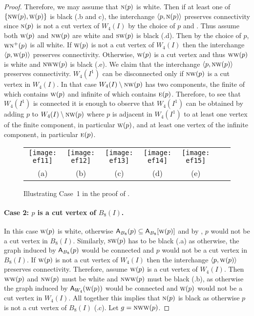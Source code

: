 \documentclass[lotsofwhite,charterfonts]{patmorin}
\newcommand{\N}{\textsc{n}}
\newcommand{\E}{\textsc{e}}
\newcommand{\SW}{\textsc{sw}}
\newcommand{\W}{\textsc{w}}
\newcommand{\NW}{\textsc{nw}}
\newcommand{\ic}[2]{\langle #1,#2 \rangle}
\newcommand{\A}[2]{\ensuremath{\protect\textup{\textsf{A}}_{#2}(#1)}}
\newcommand{\AC}[2]{\ensuremath{\protect\textup{\textsf{A}}_{#2}[#1]}}
\newcommand{\sm}{\ensuremath{\setminus}}
\newcommand{\se}{\ensuremath{\subseteq}}
\begin{document}
\begin{proof}
Therefore, we may assume that $\N(p)$ is white. Then if at least one of $\{\NW(p), \W(p)\}$ is black (.b and c), the interchange $\ic{p}{\N(p)}$ preserves connectivity since $\N(p)$ is not a cut vertex of $W_4(I)$ by the choice of $p$ and . Thus assume both $\W(p)$ and $\NW(p)$ are white and $\SW(p)$ is black (.d). Then by the choice of $p$, $\W\N^+(p)$ is all white. If $\W(p)$ is not a cut vertex of $W_4(I)$ then  the interchange $\ic{p}{\W(p)}$ preserves connectivity. Otherwise,  $\W(p)$ is a cut vertex and thus $\W\W(p)$ is white and $\NW\W(p)$ is black (.e). We claim that the interchange $\ic{p}{\NW(p)}$ preserves connectivity.  $W_4(I^1)$ can be disconnected only if $\NW(p)$ is a cut vertex in $W_4(I)$.
 In that case  $W_4(I)\sm \NW(p)$ has two components, the finite of which contains $\W(p)$ and infinite of which contains $\E(p)$. Therefore, to see that $W_4(I^1)$ is connected it is enough to observe that $W_4(I^1)$ can be obtained by adding $p$ to $W_4(I)\sm \NW(p)$ where $p$ is adjacent in $W_4(I^1)$ to at least one vertex of the finite component, in particular $\W(p)$, and at least one vertex of the infinite component, in particular $\E(p)$.

\begin{figure}[htbp]
\begin{center}
\begin{tabular}{ccccccc}
\texttt{[image: ef11]} & 
\texttt{[image: ef12]} & 
\texttt{[image: ef13]} & 
\texttt{[image: ef14]} & 
\texttt{[image: ef15]} 
\\
(a) & (b) & (c) & (d) & (e)
\end{tabular}
\end{center}
\caption{Illustrating Case~1 in the proof of .}
\end{figure}


\paragraph{Case 2: $p$ is a cut vertex of $B_8(I)$.} In this case $\W(p)$ is white, otherwise $\A{p}{B_8}\se \AC{\W(p)}{B_8}$ and by , $p$ would not be a cut vertex in $B_8(I)$. Similarly, $\SW(p)$ has to be black (.a) as otherwise, the graph induced by $\A{p}{B_8}$ would be connected and $p$ would not be a cut vertex in $B_8(I)$. If $\W(p)$ is not a cut vertex of $W_4(I)$ then  the interchange $\ic{p}{\W(p)}$ preserves connectivity. Therefore, assume $\W(p)$ is a cut vertex of $W_4(I)$. Then $\W\W(p)$ and $\NW(p)$ must be white and $\NW\W(p)$ must be black (.b), as otherwise the graph induced by $\A{\W(p)}{W_4}$ would be connected and $\W(p)$ would not be a cut vertex in $W_4(I)$. All together this implies that $\N(p)$ is black as otherwise $p$ is not a cut vertex of $B_8(I)$ (.c). Let $g=\NW\W(p)$.


\end{proof}
\end{document}
